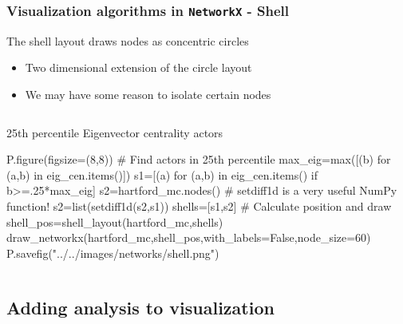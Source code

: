 \documentclass[xcolor=dvipsnames, 9pt]{beamer}
\begin{document}
\begin{frame}[fragile]
    \frametitle{Visualization algorithms in \texttt{NetworkX} - Shell}
    The shell layout draws nodes as concentric circles
    \begin{itemize}
        \item Two dimensional extension of the circle layout
        \item We may have some reason to isolate certain nodes
    \end{itemize}
    \begin{columns}
            \begin{block}{25th percentile Eigenvector centrality actors}
                \begin{code}
\scriptsize{P.figure(figsize=(8,8))
\alert<2>{# Find actors in 25th percentile
max_eig=max([(b) for (a,b) in eig_cen.items()])
s1=[(a) for (a,b) in eig_cen.items() if b>=.25*max_eig]
s2=hartford_mc.nodes()}
\alert<3>{# setdiff1d is a very useful NumPy function!
s2=list(setdiff1d(s2,s1))       
shells=[s1,s2]}    
\alert<4>{# Calculate position and draw          
shell_pos=shell_layout(hartford_mc,shells)
draw_networkx(hartford_mc,shell_pos,with_labels=False,node_size=60)
P.savefig("../../images/networks/shell.png")}}
                \end{code}
            \end{block}
    \end{columns}
    \vspace{2mm}
\end{frame}


\subsection{Adding analysis to visualization} %
\label{sub:adding_analysis_to_visualization}
\end{document}
